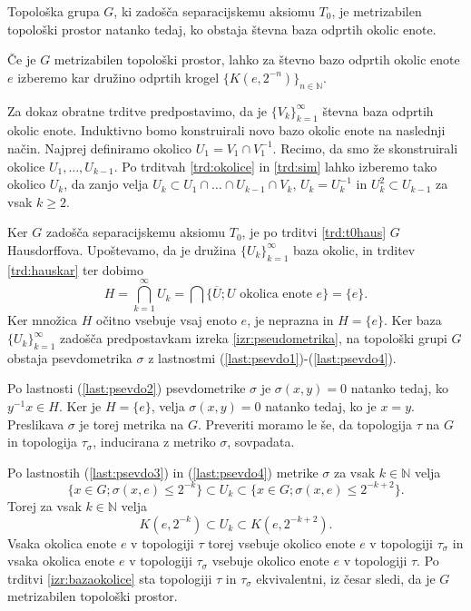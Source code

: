 \documentclass[mat1]{fmfdelo}
\newcommand{\N}{\mathbb N}
\newcommand{\closure}[1]{\overline{#1}}
\begin{document}
\begin{izrek}\label{izr:metrizabilnost}
	Topološka grupa $G$, ki zadošča separacijskemu aksiomu $T_0$, je me\-tri\-za\-bi\-len topološki prostor natanko tedaj, ko obstaja števna baza odprtih okolic enote.
\end{izrek}

\begin{dokaz}
Če je $G$ metrizabilen topološki prostor, lahko za števno bazo odprtih okolic enote $e$ izberemo kar družino odprtih krogel $\lbrace K(e, 2^{-n}) \rbrace_{n \in \N}$.

Za dokaz obratne trditve predpostavimo, da je $\lbrace V_k \rbrace_{k = 1}^\infty$ števna baza odprtih okolic enote. Induktivno bomo konstruirali novo bazo okolic enote na naslednji način. Najprej definiramo okolico $U_1 = V_1 \cap V_1^{-1}$. Recimo, da smo že skonstruirali okolice $U_1,\dots,U_{k-1}$. 
Po trditvah \ref{trd:okolice} in \ref{trd:sim} lahko
izberemo tako okolico $U_k$, da zanjo velja $U_k \subset U_1 \cap \dots \cap U_{k-1}\cap V_k$, $U_k = U_k^{-1}$ in $U_k^2 \subset U_{k-1}$ za vsak $k \geq 2$.

Ker $G$ zadošča separacijskemu aksiomu $T_0$, je po trditvi \ref{trd:t0haus} $G$ Hausdorffova. Upoštevamo, da je družina $\lbrace U_k \rbrace_{k=1}^\infty$ baza okolic, in trditev \ref{trd:hauskar} ter dobimo
\[ H = \bigcap_{k=1}^\infty U_k = \bigcap\lbrace \closure{U} ; U \text{ okolica enote } e \rbrace = \lbrace e \rbrace. \]
Ker množica $H$ očitno vsebuje vsaj enoto $e$, je neprazna in $H = \lbrace e \rbrace$.
Ker baza $\lbrace U_k \rbrace_{k = 1}^\infty$ zadošča predpostavkam izreka \ref{izr:pseudometrika}, na topološki grupi $G$ obstaja psevdometrika $\sigma$ z lastnostmi (\ref{last:psevdo1})-(\ref{last:psevdo4}).

Po lastnosti (\ref{last:psevdo2}) psevdometrike $\sigma$ je $\sigma(x, y) = 0$ natanko tedaj, ko $y^{-1}x \in H$. Ker je $H = \lbrace e \rbrace$, velja $\sigma(x, y) = 0$ natanko tedaj, ko je $x = y$. Preslikava $\sigma$ je torej metrika na $G$. Preveriti moramo le še, da topologija $\tau$ na $G$ in topologija $\tau_\sigma$, inducirana z metriko $\sigma$, sovpadata.

Po lastnostih (\ref{last:psevdo3}) in (\ref{last:psevdo4}) metrike $\sigma$ za vsak $k \in \N$ velja
\[ \lbrace x \in G ; \sigma(x, e) \leq 2^{-k} \rbrace \subset U_k \subset \lbrace x \in G ; \sigma(x, e) \leq 2^{-k+2} \rbrace.\]
Torej za vsak $k \in \N$ velja
\[ K(e, 2^{-k}) \subset U_k \subset K(e, 2^{-k+2}). \]
Vsaka okolica enote $e$ v topologiji $\tau$ torej vsebuje okolico enote $e$ v topologiji $\tau_\sigma$ in vsaka okolica enote $e$ v topologiji $\tau_\sigma$ vsebuje okolico enote $e$ v topologiji $\tau$.
Po trditvi \ref{izr:bazaokolice} sta topologiji $\tau$ in $\tau_\sigma$  ekvivalentni, iz česar sledi, da je $G$ metrizabilen topološki prostor.
\end{dokaz}
\end{document}
